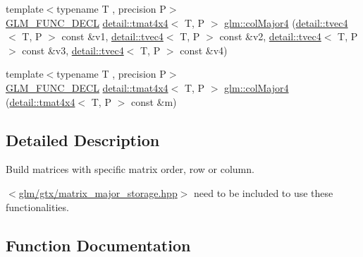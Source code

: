 \begin{DoxyCompactItemize}
\item 
{\footnotesize template$<$typename T , precision P$>$ }\\\hyperlink{setup_8hpp_ab2d052de21a70539923e9bcbf6e83a51}{G\+L\+M\+\_\+\+F\+U\+N\+C\+\_\+\+D\+E\+CL} \hyperlink{structglm_1_1detail_1_1tmat4x4}{detail\+::tmat4x4}$<$ T, P $>$ \hyperlink{group__gtx__matrix__major__storage_ga50e127c56370410d8054be2cdef03503}{glm\+::col\+Major4} (\hyperlink{structglm_1_1detail_1_1tvec4}{detail\+::tvec4}$<$ T, P $>$ const \&v1, \hyperlink{structglm_1_1detail_1_1tvec4}{detail\+::tvec4}$<$ T, P $>$ const \&v2, \hyperlink{structglm_1_1detail_1_1tvec4}{detail\+::tvec4}$<$ T, P $>$ const \&v3, \hyperlink{structglm_1_1detail_1_1tvec4}{detail\+::tvec4}$<$ T, P $>$ const \&v4)
\item 
{\footnotesize template$<$typename T , precision P$>$ }\\\hyperlink{setup_8hpp_ab2d052de21a70539923e9bcbf6e83a51}{G\+L\+M\+\_\+\+F\+U\+N\+C\+\_\+\+D\+E\+CL} \hyperlink{structglm_1_1detail_1_1tmat4x4}{detail\+::tmat4x4}$<$ T, P $>$ \hyperlink{group__gtx__matrix__major__storage_ga89086c0396205669304be98a8c601b78}{glm\+::col\+Major4} (\hyperlink{structglm_1_1detail_1_1tmat4x4}{detail\+::tmat4x4}$<$ T, P $>$ const \&m)
\end{DoxyCompactItemize}


\subsection{Detailed Description}
Build matrices with specific matrix order, row or column. 

$<$\hyperlink{matrix__major__storage_8hpp}{glm/gtx/matrix\+\_\+major\+\_\+storage.\+hpp}$>$ need to be included to use these functionalities. 

\subsection{Function Documentation}
\mbox{\label{group__gtx__matrix__major__storage_gae53863d1ced5629d5aa3ce04abf14ab1}} 
